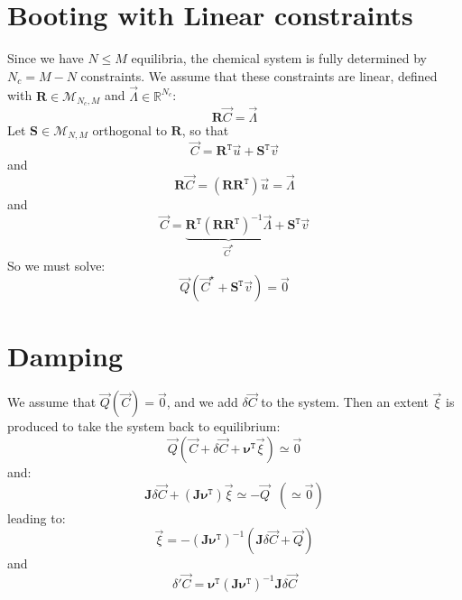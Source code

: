 \documentclass[aps,12pt]{revtex4}
\newcommand{\trn}[1]{{#1}^{\mathtt{T}}}
\begin{document}
\section{Booting  with Linear constraints}
Since we have $N\leq M$ equilibria, the chemical system is fully determined by
$N_c=M-N$ constraints.
We assume that these constraints are linear, defined with $\bm{R}\in\mathcal{M}_{N_c,M}$ and $\vec{\Lambda}\in\mathbb{R}^{N_c}$:
\begin{equation}
	\bm{R} \vec{C} = \vec{\Lambda}
\end{equation}
Let $\bm{S}\in\mathcal{M}_{N,M}$ orthogonal to $\bm{R}$, so that
\begin{equation}
	\vec{C} = \trn{\bm{R}} \vec{u} + \trn{\bm{S}} \vec{v}
\end{equation}
and
\begin{equation}
	\bm{R} \vec{C} = \left(\bm{R} \trn{\bm{R}}\right) \vec{u} = \vec{\Lambda}
\end{equation}
and
\begin{equation}
	\vec{C} = \underbrace{\trn{\bm{R}} \left(\bm{R} \trn{\bm{R}}\right)^{-1} \vec{\Lambda}}_{\vec{C}^\star} + \trn{\bm{S}} \vec{v}
\end{equation}
So we must solve:
\begin{equation}
	\vec{Q} \left( \vec{C}^\star + \trn{\bm{S}}\vec{v} \right) = \vec{0}
\end{equation}

\section{Damping}

We assume that $\vec{Q}\left({\vec{C}}\right)=\vec{0}$, and we add $\delta\vec{C}$ to the system. Then an extent $\vec{\xi}$
is produced to take the system back to equilibrium:
\begin{equation}
	\vec{Q}\left(\vec{C}+\delta\vec{C}+\trn{\bm{\nu}}\vec{\xi}\right)\simeq \vec{0}
\end{equation}
and:
\begin{equation}
	\bm{J}\delta\vec{C} + \left(\bm{J}\trn{\bm{\nu}}\right)\vec{\xi} \simeq -\vec{Q} \;\; (\simeq\vec{0})
\end{equation}
leading to:
\begin{equation}
	\vec{\xi} = -\left(\bm{J}\trn{\bm{\nu}}\right)^{-1} \left( \bm{J} \delta\vec{C} + \vec{Q} \right)
\end{equation}
and
\begin{equation}
	\delta'\vec{C} = \trn{\bm{\nu}} \left(\bm{J}\trn{\bm{\nu}}\right)^{-1} \bm{J} \delta\vec{C}
\end{equation}
\end{document}
